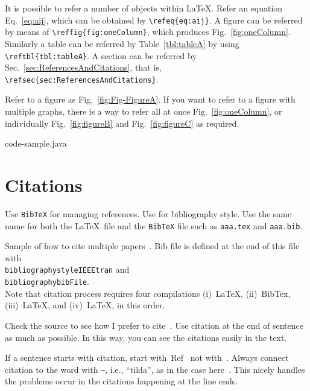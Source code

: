\documentclass[pre,twocolumn,showkeys,longbibliography]{revtex4-1}
\newcommand{\reffig}[1]{Fig.~\ref{#1}}
\newcommand{\refeq}[1]{Eq.~\ref{#1}}
\newcommand{\reftbl}[1]{Table~\ref{#1}}
\newcommand{\refsec}[1]{Sec.~\ref{#1}}
\newcommand{\refcite}[1]{Ref~\cite{#1}}
\newcommand{\hCode}[1]{\texttt{#1}}
\theoremstyle{plain}
\theoremstyle{definition}
\theoremstyle{remark}
\begin{document}
It is possible to refer a number of objects within \LaTeX.
Refer an equation \refeq{eq:aij}, which can be obtained by \verb!\refeq{eq:aij}!. 
A figure can be referred by means of \verb!\reffig{fig:oneColumn}!, which produces \reffig{fig:oneColumn}.
Similarly a table can be referred by \reftbl{tbl:tableA} by using \verb!\reftbl{tbl:tableA}!.
A section can be referred by \refsec{sec:ReferencesAndCitations}, 
that is, 
\verb!\refsec{sec:ReferencesAndCitations}!.

Refer to a figure as \reffig{fig:Fig-FigureA}.
If you want to refer to a figure with multiple graphs,
there is a way to refer all at once \reffig{fig:oneColumn},
or individually \reffig{fig:figureB} and \reffig{fig:figureC} as required.







	{code-sample.java}




\section{Citations}

Use \hCode{BibTeX} for managing references.
Use \verb!! for bibliography style.
Use the same name for both the \LaTeX\ file and the \hCode{BibTeX} file such as
\hCode{aaa.tex} and \hCode{aaa.bib}.

Sample of how to cite multiple papers~\cite{%
	chomsky1993,
	wikiComplexNetwork%
	}.
Bib file is defined at the end of this file with\\
\hCode{bibliographystyle{IEEEtran}} and\\
\hCode{bibliography{bibFile}}.\\
Note that citation process requires four compilations 
(i)~LaTeX, 
(ii)~BibTex, 
(iii)~LaTeX, and  
(iv)~LaTeX,
in this order.



Check the source to see how I prefer to cite~\cite{%
	chomsky1993,%
	acemoglu2010,%
	wikiComplexNetwork}.
Use citation at  the end of sentence as much as possible.
In this way, 
you can see the citations easily in the text.

If a sentence starts with citation,
start with~\refcite{%
	acemoglu2010}  
not with~\cite{%
	acemoglu2010}.
Always connect citation to the word with \verb!~!, 
i.e., ``tilda'', 
as in the case here~\cite{%
	acemoglu2010}.
This nicely handles the problems occur in the citations happening at the line ends.
\end{document}
